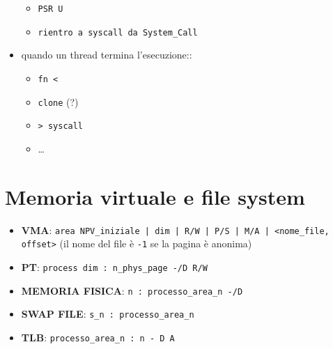 \documentclass[12pt, a4paper]{report}
\begin{document}
\begin{itemize}
\begin{itemize}
			\item \texttt{PSR U}
			\item \texttt{rientro a syscall da System\_Call}
		\end{itemize}
	\item quando un thread termina l'esecuzione::
		\begin{itemize}
			\item \texttt{fn <}
			\item \texttt{clone} (?) %
			\item \texttt{> syscall}
			\item \dots
		\end{itemize}
\end{itemize}


\newpage
\section*{Memoria virtuale e file system}

\begin{itemize}
	\item \textbf{VMA}: \texttt{area NPV\_iniziale | dim | R/W | P/S | M/A |
		<nome\_file, offset>}
		(il nome del file è \texttt{-1} se la pagina è anonima)
	\item \textbf{PT}: \texttt{process dim : n\_phys\_page -/D R/W}
	\item \textbf{MEMORIA FISICA}: \texttt{n : processo\_area\_n -/D}
	\item \textbf{SWAP FILE}: \texttt{s\_n : processo\_area\_n}
	\item \textbf{TLB}: \texttt{processo\_area\_n : n - D A}
\end{itemize}
\end{document}
